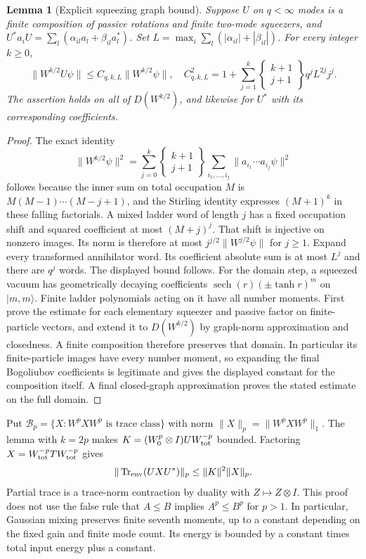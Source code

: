 \documentclass[11pt]{article}
\newcommand{\Tr}{\operatorname{Tr}}
\newtheorem{lemma}[theorem]{Lemma}
\theoremstyle{remark}\newtheorem{remark}[theorem]{Remark}
\begin{document}
\begin{lemma}[Explicit squeezing graph bound]\label{lem:graph}
Suppose $U$ on $q<\infty$ modes is a finite composition of passive
rotations and finite two-mode squeezers, and
$U^*a_iU=\sum_l(\alpha_{il}a_l+\beta_{il}a_l^*)$.
Set $L=\max_i\sum_l(|\alpha_{il}|+|\beta_{il}|)$.
For every integer $k\ge0$,
\[
 \|W^{k/2}U\psi\|\le C_{q,k,L}\|W^{k/2}\psi\|,
\quad
 C_{q,k,L}^2=1+\sum_{j=1}^k
 \left\{\begin{matrix}k+1\\j+1\end{matrix}\right\}q^j L^{2j}j^j.
\]
The assertion holds on all of $D(W^{k/2})$, and likewise for $U^*$
with its corresponding coefficients.
\end{lemma}
\begin{proof}
The exact identity
\[
 \|W^{k/2}\psi\|^2=
 \sum_{j=0}^k\left\{\begin{matrix}k+1\\j+1\end{matrix}\right\}
 \sum_{i_1,\ldots,i_j}\|a_{i_1}\cdots a_{i_j}\psi\|^2
\]
follows because the inner sum on total occupation $M$ is
$M(M-1)\cdots(M-j+1)$, and the Stirling identity expresses $(M+1)^k$
in these falling factorials. A mixed ladder word of length $j$ has a
fixed occupation shift and squared coefficient at most $(M+j)^j$.
That shift is injective on nonzero images. Its norm is therefore at most
$j^{j/2}\|W^{j/2}\psi\|$ for $j\ge1$.
Expand every transformed annihilator word. Its coefficient absolute sum
is at most $L^j$ and there are $q^j$ words. The displayed bound follows.
For the domain step, a squeezed vacuum has geometrically decaying
coefficients $\operatorname{sech}(r)(\pm\tanh r)^m$ on $|m,m\rangle$.
Finite ladder polynomials acting on it have all number moments.
First prove the estimate for each elementary squeezer and passive factor
on finite-particle vectors, and extend it to $D(W^{k/2})$ by graph-norm
approximation and closedness. A finite composition therefore preserves
that domain. In particular its finite-particle images have every number
moment, so expanding the final Bogoliubov coefficients is legitimate and
gives the displayed constant for the composition itself. A final
closed-graph approximation proves the stated estimate on the full domain.
\end{proof}

Put $\mathcal B_p=\{X:W^pXW^p\text{ is trace class}\}$ with norm
$\|X\|_p=\|W^pXW^p\|_1$. The lemma with $k=2p$ makes
$K=(W_0^p\otimes I)UW_{\rm tot}^{-p}$ bounded.
Factoring $X=W_{\rm tot}^{-p}TW_{\rm tot}^{-p}$ gives
\begin{equation}\label{eq:weighted-channel}
 \|\Tr_{\rm env}(UXU^*)\|_p\le\|K\|^2\|X\|_p.
\end{equation}
Partial trace is a trace-norm contraction by duality with
$Z\mapsto Z\otimes I$. This proof does not use the false rule that
$A\le B$ implies $A^p\le B^p$ for $p>1$.
In particular, Gaussian mixing preserves finite seventh moments, up to
a constant depending on the fixed gain and finite mode count. Its energy
is bounded by a constant times total input energy plus a constant.
\end{document}
